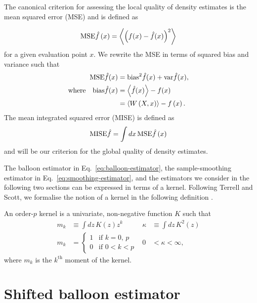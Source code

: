 The canonical criterion for assessing the local quality of density estimates is the mean squared error (MSE) and is defined as

\[
\mathrm{MSE}\hat{f}\left(x\right)=\left\langle \left(f(x)-\hat{f}(x)\right)^{2}\right\rangle 
\]
for a given evaluation point $x$. We rewrite the MSE in terms of squared bias and variance such that 
\begin{align}
\mathrm{MSE}\hat{f}(x) & =\mathrm{bias}^{2}\hat{f}(x)+\mathrm{var}\hat{f}(x),\nonumber \\
\text{where}\quad\mathrm{bias}\hat{f}(x) & =\left\langle \hat{f}(x)\right\rangle -f(x)\label{eq:generalised-bias}\\
 & =\left\langle W\left(X,x\right)\right\rangle -f\left(x\right).\nonumber 
\end{align}
The mean integrated squared error (MISE) is defined as
\[
\mathrm{MISE}\hat{f}=\int dx\,\mathrm{MSE}\hat{f}\left(x\right)
\]
and will be our criterion for the global quality of density estimates.

The balloon estimator in Eq.~\eqref{eq:balloon-estimator}, the sample-smoothing estimator in Eq.~\eqref{eq:smoothing-estimator}, and the estimators we consider in the following two sections can be expressed in terms of a kernel. Following Terrell and Scott, we formalise the notion of a kernel in the following definition \cite{Terrell1992}.
\begin{defn}
\label{def:order-p-kernel}An order-$p$ kernel is a univariate, non-negative function $K$ such that 
\begin{equation}
\begin{aligned}m_{k} & \equiv\int dz\,K(z)z^{k} & \kappa & \equiv\int dz\,K^{2}(z)\\
m_{k} & =\begin{cases}
1 & \text{if }k=0,\,p\\
0 & \text{if }0<k<p
\end{cases} & 0 & <\kappa<\infty,
\end{aligned}
\label{eq:kernel-properties}
\end{equation}
where $m_{k}$ is the $k^{\mathrm{th}}$ moment of the kernel.
\end{defn}

\section{Shifted balloon estimator\label{sec:balloon}}

